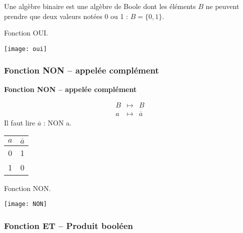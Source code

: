 Une algèbre binaire est une algèbre de Boole dont les éléments $B$ ne peuvent prendre que deux valeurs notées 0 ou 1 : $B=\{0,1 \}$. 

\begin{exemple}
Fonction OUI.

\begin{center}
\texttt{[image: oui]}
\end{center}
\end{exemple}


\subsubsection{Fonction NON -- appelée complément}
\begin{defi}
\textbf{Fonction NON -- appelée complément}

\begin{minipage}[c]{.45\linewidth}
\begin{eqnarray*}
B &\longmapsto& B\\
a &\longmapsto& \overline{a}
\end{eqnarray*}
Il faut lire $\overline{a}$ : NON a.
\end{minipage} \hfill
\begin{minipage}[c]{.45\linewidth}
\begin{center}
\begin{tabular}{|c||c|}
\hline
$a$ & $\overline{a}$ \\
\hline
0 & 1 \\
\hline
1 & 0 \\
\hline
\end{tabular}
\end{center}
\end{minipage}
\end{defi}

\begin{exemple}
Fonction NON.


\begin{center}
\texttt{[image: NON]}
\end{center}

\end{exemple}


\subsubsection{Fonction ET -- Produit booléen}

